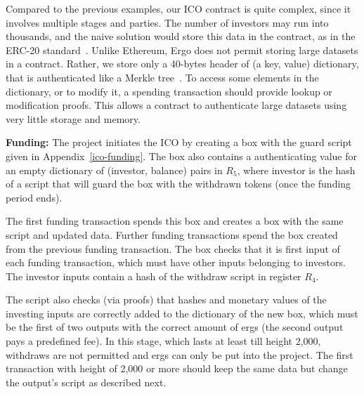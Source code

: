 \documentclass[runningheads]{llncs}
\begin{document}

Compared to the previous examples, our ICO contract is quite complex, since it involves multiple stages and parties. 
The number of investors may run into thousands, and the naive solution would store this data in the contract, as in the ERC-20 standard~\cite{erc20}. 
Unlike Ethereum, Ergo does not permit storing large datasets in a contract. Rather, we store only a 40-bytes header of (a key, value) dictionary, that is authenticated like a Merkle tree~\cite{RMCI17}. To access some elements in the dictionary, or to modify it, a spending transaction should provide lookup or modification proofs. This allows a contract to authenticate large datasets using very little storage and memory. 

\textbf{Funding:} 
The project initiates the ICO by creating a box with the guard script given in Appendix~\ref{ico-funding}. The box also contains a authenticating value for an empty dictionary of (investor, balance) pairs in $R_5$, where investor is the hash of a script that will guard the box with the withdrawn tokens (once the funding period ends). 

The first funding transaction spends this box and creates a box with the same script and updated data. Further funding transactions spend the box created from the previous funding transaction. The box checks that it is first input of each funding transaction, which must have other inputs belonging to investors. The investor inputs contain a hash of the withdraw script in register $R_4$. 

The script also checks (via proofs) that hashes and monetary values of the investing inputs are correctly added to the dictionary of the new box, which must be the first of two outputs with the correct amount of ergs (the second output pays a predefined fee). 
In this stage, which lasts at least till height 2,000, withdraws are not permitted and ergs can only be put into the project. 
The first transaction with height of 2,000 or more should keep the same data but change the output's script as described next.
\end{document}
